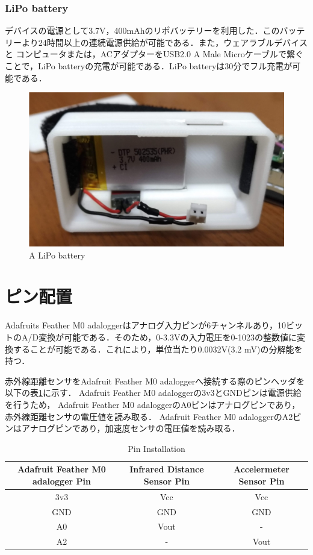 \subsubsection*{LiPo battery}
デバイスの電源として3.7V，400mAhのリポバッテリーを利用した．このバッテリーより24時間以上の連続電源供給が可能である．また，ウェアラブルデバイスと
コンピュータまたは，ACアダプターをUSB2.0 A Male Microケーブルで繋ぐことで，LiPo batteryの充電が可能である．LiPo batteryは30分でフル充電が可能である．
\begin{figure}[H]
  \centering
  \includegraphics[width=0.5\linewidth]{fig/battery}
  \caption{A LiPo battery}
  \label{fig:battery}
\end{figure}

\section{ピン配置}
Adafruits Feather M0 adaloggerはアナログ入力ピンが6チャンネルあり，10ビットのA/D変換が可能である．そのため，0-3.3Vの入力電圧を0-1023の整数値に変換することが可能である．これにより，単位当たり0.0032V(3.2 mV)の分解能を持つ．

赤外線距離センサをAdafruit Feather M0 adaloggerへ接続する際のピンヘッダを以下の表\ref{table:pin}に示す．
Adafruit Feather M0 adaloggerの3v3とGNDピンは電源供給を行うため，
Adafruit Feather M0 adaloggerのA0ピンはアナログピンであり，赤外線距離センサの電圧値を読み取る．
Adafruit Feather M0 adaloggerのA2ピンはアナログピンであり，加速度センサの電圧値を読み取る．

\begin{table}[H]
  \caption{Pin Installation}
  \centering
  \begin{tabular}{ccc}
    \hline
    Adafruit Feather M0 adalogger Pin & Infrared Distance Sensor Pin & Accelermeter Sensor Pin\\
    \hline \hline
    3v3 & Vcc & Vcc  \\
    GND & GND & GND  \\
    A0  & Vout& - \\
    A2  & -& Vout \\
    \hline
  \end{tabular}
   \label{table:pin}
\end{table}

